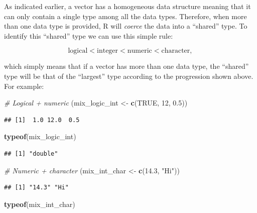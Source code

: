 \documentclass[12pt,]{krantz}
\newenvironment{Shaded}{\begin{snugshade}}{\end{snugshade}}
\newcommand{\KeywordTok}[1]{\textcolor[rgb]{0.27,0.27,0.27}{\textbf{#1}}}
\newcommand{\DecValTok}[1]{\textcolor[rgb]{0.06,0.06,0.06}{#1}}
\newcommand{\FloatTok}[1]{\textcolor[rgb]{0.06,0.06,0.06}{#1}}
\newcommand{\StringTok}[1]{\textcolor[rgb]{0.5,0.5,0.5}{#1}}
\newcommand{\CommentTok}[1]{\textcolor[rgb]{0.37,0.37,0.37}{\textit{#1}}}
\newcommand{\OtherTok}[1]{\textcolor[rgb]{0.37,0.37,0.37}{#1}}
\newcommand{\NormalTok}[1]{#1}
\begin{document}
As indicated earlier, a vector has a homogeneous data structure meaning
that it can only contain a single type among all the data types.
Therefore, when more than one data type is provided, R will
\emph{coerce} the data into a ``shared'' type. To identify this
``shared'' type we can use this simple rule:

\begin{equation*}
 \text{logical} < \text{integer} < \text{numeric} < \text{character},
\end{equation*}

which simply means that if a vector has more than one data type, the
``shared'' type will be that of the ``largest'' type according to the
progression shown above. For example:

\begin{Shaded}
\begin{Highlighting}[]
\CommentTok{# Logical + numeric}
\NormalTok{(mix_logic_int <-}\StringTok{ }\KeywordTok{c}\NormalTok{(}\OtherTok{TRUE}\NormalTok{, }\DecValTok{12}\NormalTok{, }\FloatTok{0.5}\NormalTok{))}
\end{Highlighting}
\end{Shaded}

\begin{verbatim}
## [1]  1.0 12.0  0.5
\end{verbatim}

\begin{Shaded}
\begin{Highlighting}[]
\KeywordTok{typeof}\NormalTok{(mix_logic_int)}
\end{Highlighting}
\end{Shaded}

\begin{verbatim}
## [1] "double"
\end{verbatim}

\begin{Shaded}
\begin{Highlighting}[]
\CommentTok{# Numeric + character}
\NormalTok{(mix_int_char <-}\StringTok{ }\KeywordTok{c}\NormalTok{(}\FloatTok{14.3}\NormalTok{, }\StringTok{"Hi"}\NormalTok{))}
\end{Highlighting}
\end{Shaded}

\begin{verbatim}
## [1] "14.3" "Hi"
\end{verbatim}

\begin{Shaded}
\begin{Highlighting}[]
\KeywordTok{typeof}\NormalTok{(mix_int_char)}
\end{Highlighting}
\end{Shaded}
\end{document}

